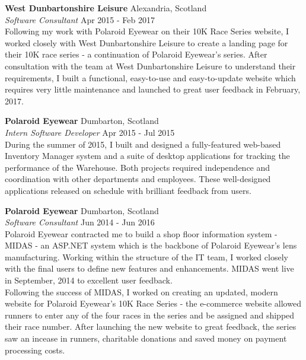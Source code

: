 \documentclass[a4paper]{article}
\begin{document}
\textbf{West Dunbartonshire Leisure} \hfill {\color{gray} Alexandria, Scotland} \\
\textit{Software Consultant} \hfill {\color{gray} Apr 2015 - Feb 2017} \\
\vspace{2mm}
Following my work with Polaroid Eyewear on their 10K Race Series website, I worked closely with
West Dunbartonshire Leisure to create a landing page for their 10K race series - a continuation of
Polaroid Eyewear’s series. After consultation with the team at West Dunbartonshire Leisure to
understand their requirements, I built a functional, easy-to-use and easy-to-update website which
requires very little maintenance and launched to great user feedback in February, 2017.
\vspace{2mm}

\textbf{Polaroid Eyewear} \hfill {\color{gray} Dumbarton, Scotland} \\
\textit{Intern Software Developer} \hfill {\color{gray} Apr 2015 - Jul 2015} \\
\vspace{2mm}
During the summer of 2015, I built and designed a fully-featured web-based Inventory Manager system
and a suite of desktop applications for tracking the performance of the Warehouse. Both projects
required independence and coordination with other departments and employees. These well-designed
applications released on schedule with brilliant feedback from users.
\vspace{2mm}

\textbf{Polaroid Eyewear} \hfill {\color{gray} Dumbarton, Scotland} \\
\textit{Software Consultant} \hfill {\color{gray} Jun 2014 - Jun 2016} \\
\vspace{2mm}
Polaroid Eyewear contracted me to build a shop floor information system - MIDAS - an ASP.NET
system which is the backbone of Polaroid Eyewear's lens manufacturing. Working within the structure
of the IT team, I worked closely with the final users to define new features and enhancements.
MIDAS went live in September, 2014 to excellent user feedback. \\
\vspace{2mm}
Following the success of MIDAS, I worked on creating an updated, modern website for Polaroid
Eyewear's 10K Race Series - the e-commerce website allowed runners to enter any of the four races
in the series and be assigned and shipped their race number. After launching the new website to
great feedback, the series saw an incease in runners, charitable donations and saved money on
payment processing costs.
\vspace{2mm}
\end{document}

